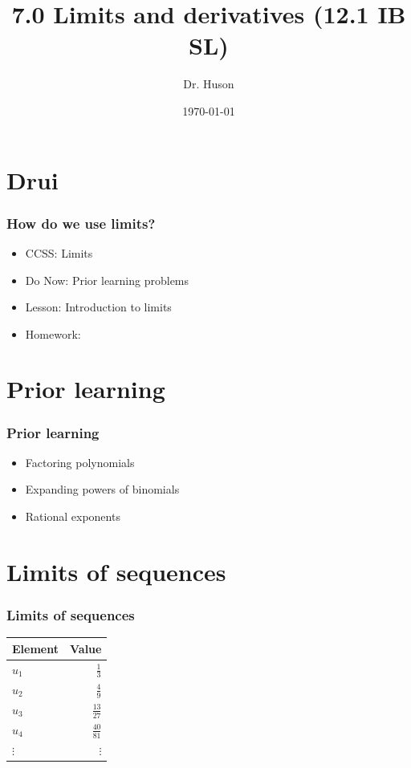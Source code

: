 \documentclass{beamer}
\title{7.0 Limits and derivatives (12.1 IB SL)}
\author{Dr. Huson}
\date{\today}
\begin{document}
\frame{\titlepage}

\section[Outline]{}
\frame{\tableofcontents}

\section{Drui}
\frame
{
  \frametitle{How do we use limits?}

  \begin{itemize}
  \item CCSS: Limits
  \item Do Now: Prior learning problems
  \item Lesson: Introduction to limits     
  \item Homework:     
  \end{itemize}
}

\section{Prior learning}
\frame
{
  \frametitle{Prior learning}

  \begin{itemize}
  \item Factoring polynomials
  \item Expanding powers of binomials
  \item Rational exponents     
  \end{itemize}
}
\section{Limits of sequences}
\frame
{
  \frametitle{Limits of sequences}
{\renewcommand{\arraystretch}{1.25}
\begin{table}
\centering
\begin{tabular}{l|r}
Element & Value \\\hline
$u_1$ & $\frac {1}{3}$ \\
$u_2$ & $\frac {4}{9}$ \\
$u_3$ & $\frac {13}{27}$ \\
$u_4$ & $\frac {40}{81}$ \\
$\vdots$ & $\vdots$
\end{tabular}
\end{table}
}}
\end{document}

